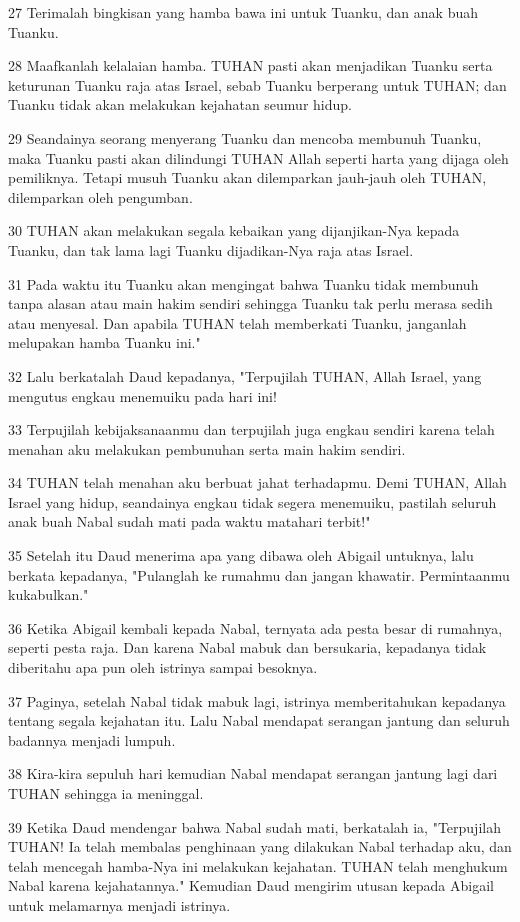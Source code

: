 \par 27 Terimalah bingkisan yang hamba bawa ini untuk Tuanku, dan anak buah Tuanku.
\par 28 Maafkanlah kelalaian hamba. TUHAN pasti akan menjadikan Tuanku serta keturunan Tuanku raja atas Israel, sebab Tuanku berperang untuk TUHAN; dan Tuanku tidak akan melakukan kejahatan seumur hidup.
\par 29 Seandainya seorang menyerang Tuanku dan mencoba membunuh Tuanku, maka Tuanku pasti akan dilindungi TUHAN Allah seperti harta yang dijaga oleh pemiliknya. Tetapi musuh Tuanku akan dilemparkan jauh-jauh oleh TUHAN, dilemparkan oleh pengumban.
\par 30 TUHAN akan melakukan segala kebaikan yang dijanjikan-Nya kepada Tuanku, dan tak lama lagi Tuanku dijadikan-Nya raja atas Israel.
\par 31 Pada waktu itu Tuanku akan mengingat bahwa Tuanku tidak membunuh tanpa alasan atau main hakim sendiri sehingga Tuanku tak perlu merasa sedih atau menyesal. Dan apabila TUHAN telah memberkati Tuanku, janganlah melupakan hamba Tuanku ini."
\par 32 Lalu berkatalah Daud kepadanya, "Terpujilah TUHAN, Allah Israel, yang mengutus engkau menemuiku pada hari ini!
\par 33 Terpujilah kebijaksanaanmu dan terpujilah juga engkau sendiri karena telah menahan aku melakukan pembunuhan serta main hakim sendiri.
\par 34 TUHAN telah menahan aku berbuat jahat terhadapmu. Demi TUHAN, Allah Israel yang hidup, seandainya engkau tidak segera menemuiku, pastilah seluruh anak buah Nabal sudah mati pada waktu matahari terbit!"
\par 35 Setelah itu Daud menerima apa yang dibawa oleh Abigail untuknya, lalu berkata kepadanya, "Pulanglah ke rumahmu dan jangan khawatir. Permintaanmu kukabulkan."
\par 36 Ketika Abigail kembali kepada Nabal, ternyata ada pesta besar di rumahnya, seperti pesta raja. Dan karena Nabal mabuk dan bersukaria, kepadanya tidak diberitahu apa pun oleh istrinya sampai besoknya.
\par 37 Paginya, setelah Nabal tidak mabuk lagi, istrinya memberitahukan kepadanya tentang segala kejahatan itu. Lalu Nabal mendapat serangan jantung dan seluruh badannya menjadi lumpuh.
\par 38 Kira-kira sepuluh hari kemudian Nabal mendapat serangan jantung lagi dari TUHAN sehingga ia meninggal.
\par 39 Ketika Daud mendengar bahwa Nabal sudah mati, berkatalah ia, "Terpujilah TUHAN! Ia telah membalas penghinaan yang dilakukan Nabal terhadap aku, dan telah mencegah hamba-Nya ini melakukan kejahatan. TUHAN telah menghukum Nabal karena kejahatannya." Kemudian Daud mengirim utusan kepada Abigail untuk melamarnya menjadi istrinya.
